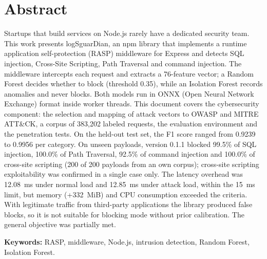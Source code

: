 \ifdefined\modoensamble
\else
	
	\chapter*{Abstract}
\fi

Startups that build services on Node.js rarely have a dedicated security team. This work presents logSguarDian, an npm library that implements a runtime application self-protection (RASP) middleware for Express and detects SQL injection, Cross-Site Scripting, Path Traversal and command injection. The middleware intercepts each request and extracts a 76-feature vector; a Random Forest decides whether to block (threshold 0.35), while an Isolation Forest records anomalies and never blocks. Both models run in ONNX (Open Neural Network Exchange) format inside worker threads. This document covers the cybersecurity component: the selection and mapping of attack vectors to OWASP and MITRE ATT\&CK, a corpus of 383,202 labeled requests, the evaluation environment and the penetration tests. On the held-out test set, the F1 score ranged from 0.9239 to 0.9956 per category. On unseen payloads, version 0.1.1 blocked 99.5\% of SQL injection, 100.0\% of Path Traversal, 92.5\% of command injection and 100.0\% of cross-site scripting (200 of 200 payloads from an own corpus); cross-site scripting exploitability was confirmed in a single case only. The latency overhead was 12.08~ms under normal load and 12.85~ms under attack load, within the 15~ms limit, but memory (+332~MiB) and CPU consumption exceeded the criteria. With legitimate traffic from third-party applications the library produced false blocks, so it is not suitable for blocking mode without prior calibration. The general objective was partially met.

\medskip
\noindent\textbf{Keywords:} RASP, middleware, Node.js, intrusion detection, Random Forest, Isolation Forest.

\ifdefined\modoensamble
\else
	
\fi
